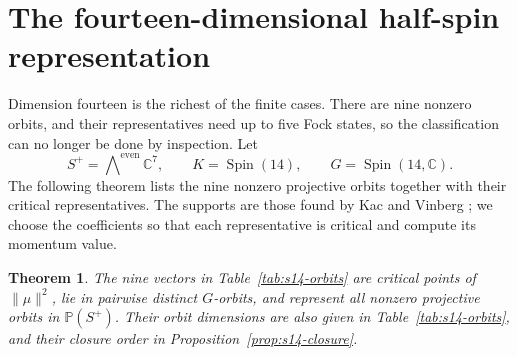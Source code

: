 \documentclass{article}
\newtheorem{theorem}{Theorem}[section]
\theoremstyle{definition}
\theoremstyle{remark}
\newcommand{\C}{\mathbb C}
\newcommand{\PP}{\mathbb P}
\newcommand{\Spin}{\operatorname{Spin}}
\newcommand{\norm}[1]{\lVert #1\rVert}
\begin{document}
\FloatBarrier

\section{The fourteen-dimensional half-spin representation}
\label{sec:spin14}

Dimension fourteen is the richest of the finite cases. There are nine
nonzero orbits, and their representatives need up to five Fock states, so the
classification can no longer be done by inspection. Let
\[
 S^+=\bigwedge\nolimits^{\mathrm{even}}\C^7,\qquad
 K=\Spin(14),\qquad G=\Spin(14,\C).
\]
The following theorem lists the nine nonzero projective orbits together with
their critical representatives.
The supports are those found by Kac and Vinberg \cite{Gatti_dim13}; we
choose the coefficients so that each representative is critical and
compute its momentum value.

\begin{theorem}
\label{thm:s14}
The nine vectors in Table~\ref{tab:s14-orbits} are critical points of
$\norm\mu^2$, lie in pairwise distinct $G$-orbits, and represent all nonzero
projective orbits in $\PP(S^+)$. Their orbit dimensions are also
given in Table~\ref{tab:s14-orbits}, and their closure order in
Proposition~\ref{prop:s14-closure}.
\end{theorem}
\end{document}

